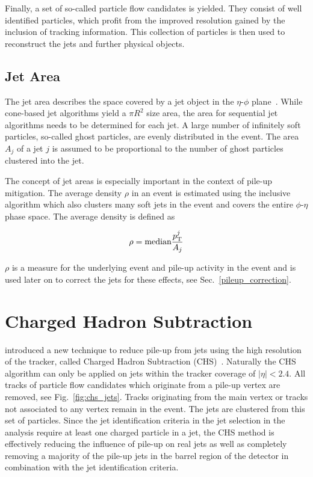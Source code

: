 Finally, a set of so-called particle flow candidates is yielded. They consist of
well identified particles, which profit from the improved resolution gained by
the inclusion of tracking information. This collection of particles is then
used to reconstruct the jets and further physical objects.


\subsection{Jet Area}

The jet area describes the space covered by a jet object in the $\eta$-$\phi$
plane~\cite{Cacciari:2008gn}. While cone-based jet algorithms yield a $\pi R^2$
size area, the area for sequential jet algorithms needs to be determined for
each jet. A large number of infinitely soft particles, so-called ghost
particles, are evenly distributed in the event. The area $A_j$ of a jet $j$ is
assumed to be proportional to the number of ghost particles clustered into the
jet. 

The concept of jet areas is especially important in the context of pile-up
mitigation. The average \pt density $\rho$ in an event is estimated using the inclusive
\kt algorithm which also clusters many soft jets in the event and covers the
entire $\phi$-$\eta$ phase space. The average \pt density is defined as

\begin{equation*}
    \rho = \text{median} \frac{p_{\mathrm{T}}^j}{A_j}
\end{equation*}

$\rho$ is a measure for the underlying event and pile-up activity in the event
and is used later on to correct the jets for these effects, see
Sec.~\ref{pileup_correction}.

\section{Charged Hadron Subtraction}
\label{sec:chs_algorithm}

\CMS introduced a new technique to reduce pile-up from jets using the high
resolution of the tracker, called Charged Hadron Subtraction
(CHS)~\cite{Kirschenmann:2014dla}. Naturally the CHS algorithm can only be
applied on jets within the tracker coverage of $|\eta| < 2.4$. All tracks of
particle flow candidates which originate from a pile-up vertex are removed, see
Fig.~\ref{fig:chs_jets}. Tracks originating from the main vertex or tracks not
associated to any vertex remain in the event. The jets are clustered from this
set of particles.  Since the jet identification criteria in the jet selection in
the analysis require at least one charged particle in a jet, the CHS method is
effectively reducing the influence of pile-up on real jets as well as completely
removing a majority of the pile-up jets in the barrel region of the \CMS
detector in combination with the jet identification criteria.

